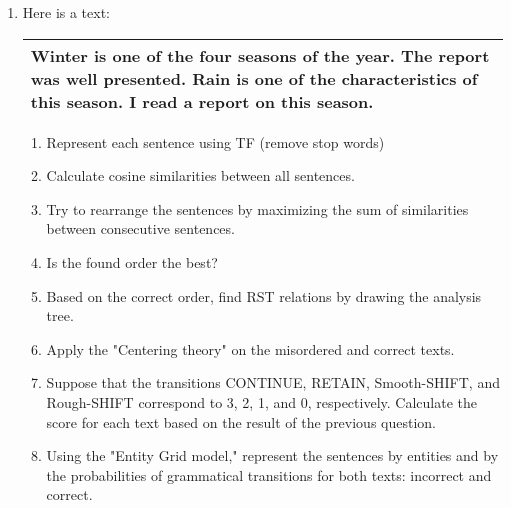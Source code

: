 \documentclass{KBook}
\begin{document}
\begin{enumerate}
	\item Here is a text: 
	
	\begin{tabular}{|p{}|}
		\hline
		Winter is one of the four seasons of the year. The report was well presented. 
		Rain is one of the characteristics of this season. 
		I read a report on this season. \\
		\hline 
	\end{tabular}
	
	\begin{enumerate}
		\item Represent each sentence using TF (remove stop words)
		\item Calculate cosine similarities between all sentences.
		\item Try to rearrange the sentences by maximizing the sum of similarities between consecutive sentences.
		\item Is the found order the best?
		\item Based on the correct order, find RST relations by drawing the analysis tree.
		\item Apply the "Centering theory" on the misordered and correct texts.
		\item Suppose that the transitions CONTINUE, RETAIN, Smooth-SHIFT, and Rough-SHIFT correspond to 3, 2, 1, and 0, respectively.
		Calculate the score for each text based on the result of the previous question.
		\item Using the "Entity Grid model," represent the sentences by entities and by the probabilities of grammatical transitions for both texts: incorrect and correct.
	\end{enumerate}
	
\end{enumerate}


%



\ifx\wholebook\relax\else
% 
% 
	
\end{document}
